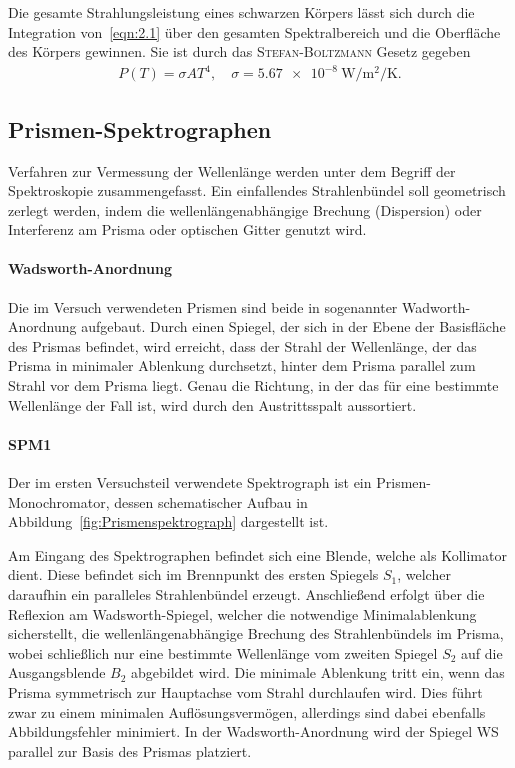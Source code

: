 \documentclass[a4paper,twoside,final]{article}
\begin{document}
Die gesamte Strahlungsleistung eines schwarzen Körpers lässt sich durch die Integration von~\eqref{eqn:2.1} über den gesamten Spektralbereich und die Oberfläche des Körpers gewinnen. Sie ist durch das \textsc{Stefan-Boltzmann} Gesetz gegeben
\begin{align}
  P(T) = \sigma A T^4, \quad \sigma = \SI[per-mode=fraction]{5.67e-8}{\watt\per\metre\squared\per\kelvin}.
\end{align}

\subsection{Prismen-Spektrographen}
Verfahren zur Vermessung der Wellenlänge werden unter dem Begriff der Spektroskopie zusammengefasst. Ein einfallendes Strahlenbündel soll geometrisch zerlegt werden, indem die wellenlängenabhängige Brechung (Dispersion) oder Interferenz am Prisma oder optischen Gitter genutzt wird.
\paragraph{Wadsworth-Anordnung} Die im Versuch verwendeten Prismen sind beide in sogenannter Wadworth-Anordnung aufgebaut. Durch einen Spiegel, der sich in der Ebene der Basisfläche des Prismas befindet, wird erreicht, dass der Strahl der Wellenlänge, der das Prisma in minimaler Ablenkung durchsetzt, hinter dem Prisma parallel zum Strahl vor dem Prisma liegt. Genau die Richtung, in der das für eine bestimmte Wellenlänge der Fall ist, wird durch den Austrittsspalt aussortiert.

\paragraph{SPM1} Der im ersten Versuchsteil verwendete Spektrograph ist ein Prismen-Monochromator, dessen schematischer Aufbau in Abbildung~\ref{fig:Prismenspektrograph} dargestellt ist.



Am Eingang des Spektrographen befindet sich eine Blende, welche als Kollimator dient. Diese befindet sich im Brennpunkt des ersten Spiegels $S_1$, welcher daraufhin ein paralleles Strahlenbündel erzeugt. Anschließend erfolgt über die Reflexion am Wadsworth-Spiegel, welcher die notwendige Minimalablenkung sicherstellt, die wellenlängenabhängige Brechung des Strahlenbündels im Prisma, wobei schließlich nur eine bestimmte Wellenlänge vom zweiten Spiegel $S_2$ auf die Ausgangsblende $B_2$ abgebildet wird. Die minimale Ablenkung tritt ein, wenn das Prisma symmetrisch zur Hauptachse vom Strahl durchlaufen wird. Dies führt zwar zu einem minimalen Auflösungsvermögen, allerdings sind dabei ebenfalls Abbildungsfehler minimiert. In der Wadsworth-Anordnung wird der Spiegel WS parallel zur Basis des Prismas platziert.
\end{document}
